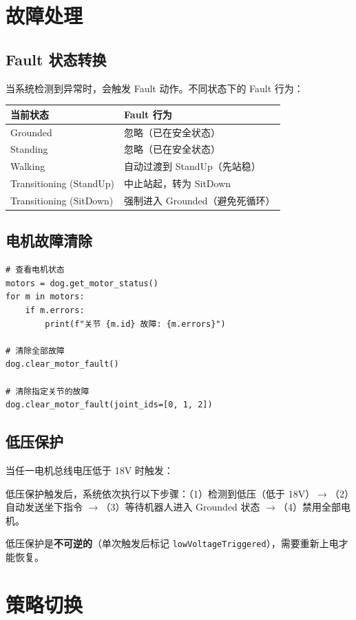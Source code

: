 \documentclass[a4paper,11pt,openany]{book}
\begin{document}
\section{故障处理}

\subsection{Fault 状态转换}

当系统检测到异常时，会触发 Fault 动作。不同状态下的 Fault 行为：

\begin{longtable}{ll}
\toprule
当前状态 & Fault 行为 \\
\midrule
\endhead
Grounded & 忽略（已在安全状态） \\
Standing & 忽略（已在安全状态） \\
Walking & 自动过渡到 StandUp（先站稳） \\
Transitioning (StandUp) & 中止站起，转为 SitDown \\
Transitioning (SitDown) & 强制进入 Grounded（避免死循环） \\
\bottomrule
\end{longtable}

\subsection{电机故障清除}

\begin{lstlisting}[style=python]
# 查看电机状态
motors = dog.get_motor_status()
for m in motors:
    if m.errors:
        print(f"关节 {m.id} 故障: {m.errors}")

# 清除全部故障
dog.clear_motor_fault()

# 清除指定关节的故障
dog.clear_motor_fault(joint_ids=[0, 1, 2])
\end{lstlisting}

\subsection{低压保护}

当任一电机总线电压低于 18V 时触发：

低压保护触发后，系统依次执行以下步骤：（1）检测到低压（低于 18V）$\to$（2）自动发送坐下指令 $\to$（3）等待机器人进入 Grounded 状态 $\to$（4）禁用全部电机。

低压保护是\textbf{不可逆的}（单次触发后标记 \texttt{lowVoltageTriggered}），需要重新上电才能恢复。

\section{策略切换}
\end{document}
